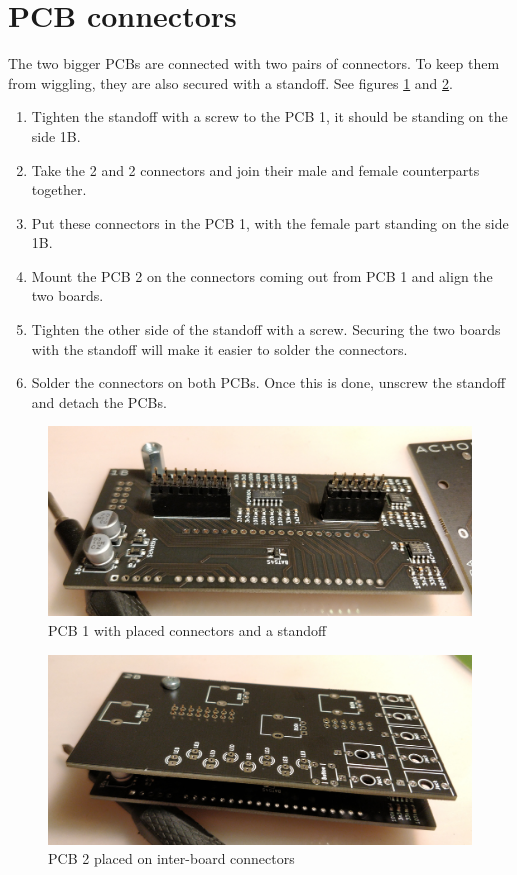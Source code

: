 \documentclass[10pt,a4paper,twocolumn]{article}
\begin{document}
\section{PCB connectors}

The two bigger PCBs are connected with two pairs of connectors. To keep them
from wiggling, they are also secured with a standoff. See figures \ref{pcb1}
and \ref{pcb2}.

\begin{enumerate}
  \item Tighten the standoff with a screw to the PCB 1, it should be standing on the side 1B.
  \item Take the 2 and 2 connectors and join their male and female counterparts together.
  \item Put these connectors in the PCB 1, with the female part standing on the side 1B.
  \item Mount the PCB 2 on the connectors coming out from PCB 1 and align the two boards.
  \item Tighten the other side of the standoff with a screw. Securing the two boards with the standoff will make it easier to solder the connectors.
  \item Solder the connectors on both PCBs. Once this is done, unscrew the standoff and detach the PCBs.
\end{enumerate}

\begin{figure}[p]
  \centering
  \includegraphics[width=\linewidth]{p02.jpg}
  \caption{PCB 1 with placed connectors and a standoff}
  \label{pcb1}
\end{figure}

\begin{figure}[p]
  \centering
  \includegraphics[width=\linewidth]{p03.jpg}
  \caption{PCB 2 placed on inter-board connectors}
  \label{pcb2}
\end{figure}
\end{document}
